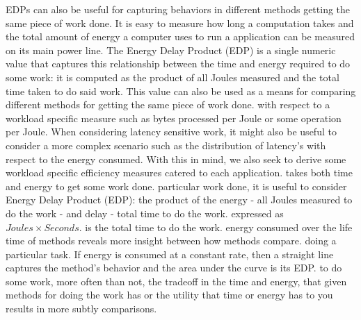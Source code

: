 EDPs can also be useful for capturing behaviors in different methods  getting
the same piece of work done.
It is easy to measure how long a computation takes and the total amount of
energy a computer uses to run a application can be measured on its main power
line.
%
The Energy Delay Product (EDP) is a single numeric value that captures this
relationship between the time and energy required to do some work: it is
computed as the product of all Joules measured and the total time taken to do
said work. This value can also be used as a means for comparing different
methods for getting the same piece of work done.
%
%
with respect to a workload specific measure such as bytes processed per Joule
or some operation per Joule. When considering latency sensitive work, it might
also be useful to consider a more complex scenario such as the distribution of
latency's with respect to the energy consumed. With this in mind, we also seek
to derive some workload specific efficiency measures catered to each
application.
%
takes both time and energy to get some work done.
particular work done, it is useful to consider Energy Delay Product (EDP): the
product of the energy - all Joules measured to do the work - and delay - total
time to do the work.
expressed as $Joules \times Seconds$.
is the total time to do the work.
energy consumed over the life time of methods reveals more insight between how
methods compare.
%
%
doing a particular task. If energy is consumed at a constant rate, then a
straight line captures the method's behavior and the area under the curve is
its EDP.
to do some work, more often than not, the tradeoff in the time and energy, that
given methods for doing the work has or the utility that time or energy has to
you results in more subtly comparisons.
